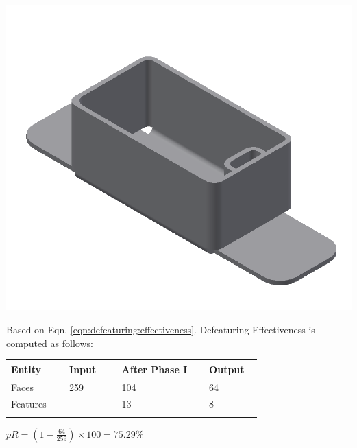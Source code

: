 \begin{minipage}{\linewidth}
\begin{minipage}[c]{0.62\linewidth}
\includegraphics[width=\linewidth,valign=t]{images/SheetMetal_Medium_Enclosure_DefeaturedPart}
 \label{fig:results:deft}


Based on Eqn. \ref{eqn:defeaturing:effectiveness}. Defeaturing Effectiveness is computed as follows:

\begin{longtable}[h]{@{} p{0.2\linewidth} p{0.18\linewidth} p{0.3\linewidth} p{0.18\linewidth} @{}}\toprule
\textbf{Entity} & \textbf{Input} & \textbf{After Phase I} & \textbf{Output}\\  \midrule
Faces  & 259 & 104 & 64\\
Features  &  &13 & 8\\
\bottomrule
\label{tbl:fig:defeat}
\end{longtable}

$pR = (1 - \frac{64}{259}) \times 100 = 75.29\%$


\end{minipage}
\end{minipage}
